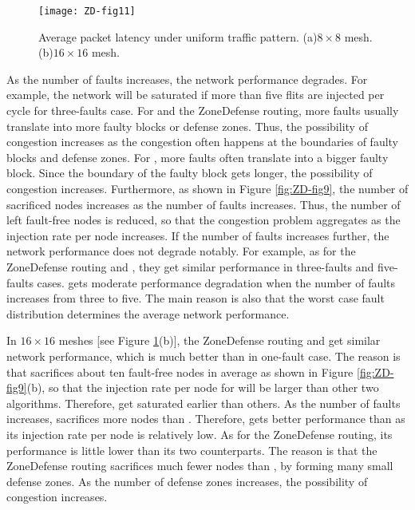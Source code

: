 \begin{figure}[h]
    \centering
        \texttt{[image: ZD-fig11]}
          \caption{Average packet latency under uniform traffic pattern. (a)$8 \times 8$ mesh. (b)$16 \times 16$ mesh.}
        \label{fig:ZD-fig11}
\end{figure}

As the number of faults increases, the network performance degrades. For example, the network will be saturated if more than five flits are injected per cycle for three-faults case. For \cite{wu2003fault} and the ZoneDefense routing, more faults usually translate into more faulty blocks or defense zones. Thus, the possibility of congestion increases as the congestion often happens at the boundaries of faulty blocks and defense zones. For \cite{zhang2008reconfigurable}, more faults often translate into a bigger faulty block. Since the boundary of the faulty block gets longer, the possibility of congestion increases. Furthermore, as shown in Figure \ref{fig:ZD-fig9}, the number of sacrificed nodes increases as the number of faults increases. Thus, the number of left fault-free nodes is reduced, so that the congestion problem aggregates as the injection rate per node increases. If the number of faults increases further, the network performance does not degrade notably. For example, as for the ZoneDefense routing and \cite{wu2003fault}, they get similar performance in three-faults and five-faults cases. \cite{zhang2008reconfigurable} gets moderate performance degradation when the number of faults increases from three to five. The main reason is also that the worst case fault distribution determines the average network performance.

In $16 \times 16$ meshes [see Figure \ref{fig:ZD-fig11}(b)], the ZoneDefense routing and \cite{zhang2008reconfigurable} get similar network performance, which
is much better than \cite{wu2003fault} in one-fault case. The reason is that \cite{wu2003fault} sacrifices about ten fault-free nodes in average as shown in Figure \ref{fig:ZD-fig9}(b), so that the injection rate per node for \cite{wu2003fault} will be larger than other two algorithms. Therefore, \cite{wu2003fault} get saturated earlier than others. As the number of faults increases, \cite{zhang2008reconfigurable} sacrifices more nodes than \cite{wu2003fault}. Therefore, \cite{wu2003fault} gets better performance than \cite{zhang2008reconfigurable} as its injection rate per node is relatively low. As for the ZoneDefense routing, its performance is little lower than its two counterparts. The reason is that the ZoneDefense routing sacrifices much fewer nodes than \cite{wu2003fault}, \cite{zhang2008reconfigurable} by forming many small defense zones. As the number of defense zones increases, the possibility of congestion increases.

